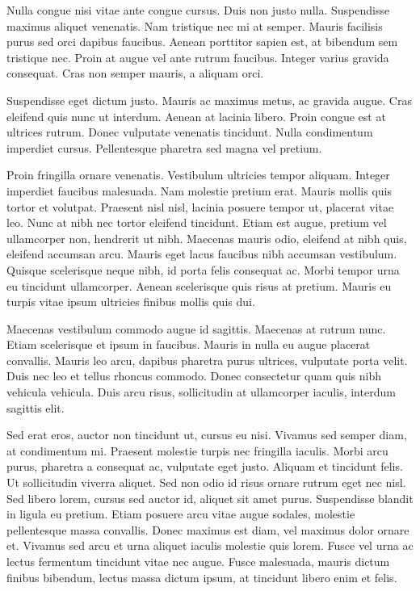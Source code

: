 Nulla congue nisi vitae ante congue cursus. Duis non justo nulla. Suspendisse maximus aliquet venenatis. Nam tristique nec mi at semper. Mauris facilisis purus sed orci dapibus faucibus. Aenean porttitor sapien est, at bibendum sem tristique nec. Proin at augue vel ante rutrum faucibus. Integer varius gravida consequat. Cras non semper mauris, a aliquam orci.

Suspendisse eget dictum justo. Mauris ac maximus metus, ac gravida augue. Cras eleifend quis nunc ut interdum. Aenean at lacinia libero. Proin congue est at ultrices rutrum. Donec vulputate venenatis tincidunt. Nulla condimentum imperdiet cursus. Pellentesque pharetra sed magna vel pretium.

Proin fringilla ornare venenatis. Vestibulum ultricies tempor aliquam. Integer imperdiet faucibus malesuada. Nam molestie pretium erat. Mauris mollis quis tortor et volutpat. Praesent nisl nisl, lacinia posuere tempor ut, placerat vitae leo. Nunc at nibh nec tortor eleifend tincidunt. Etiam est augue, pretium vel ullamcorper non, hendrerit ut nibh. Maecenas mauris odio, eleifend at nibh quis, eleifend accumsan arcu. Mauris eget lacus faucibus nibh accumsan vestibulum. Quisque scelerisque neque nibh, id porta felis consequat ac. Morbi tempor urna eu tincidunt ullamcorper. Aenean scelerisque quis risus at pretium. Mauris eu turpis vitae ipsum ultricies finibus mollis quis dui.

Maecenas vestibulum commodo augue id sagittis. Maecenas at rutrum nunc. Etiam scelerisque et ipsum in faucibus. Mauris in nulla eu augue placerat convallis. Mauris leo arcu, dapibus pharetra purus ultrices, vulputate porta velit. Duis nec leo et tellus rhoncus commodo. Donec consectetur quam quis nibh vehicula vehicula. Duis arcu risus, sollicitudin at ullamcorper iaculis, interdum sagittis elit.

Sed erat eros, auctor non tincidunt ut, cursus eu nisi. Vivamus sed semper diam, at condimentum mi. Praesent molestie turpis nec fringilla iaculis. Morbi arcu purus, pharetra a consequat ac, vulputate eget justo. Aliquam et tincidunt felis. Ut sollicitudin viverra aliquet. Sed non odio id risus ornare rutrum eget nec nisl. Sed libero lorem, cursus sed auctor id, aliquet sit amet purus. Suspendisse blandit in ligula eu pretium. Etiam posuere arcu vitae augue sodales, molestie pellentesque massa convallis. Donec maximus est diam, vel maximus dolor ornare et. Vivamus sed arcu et urna aliquet iaculis molestie quis lorem. Fusce vel urna ac lectus fermentum tincidunt vitae nec augue. Fusce malesuada, mauris dictum finibus bibendum, lectus massa dictum ipsum, at tincidunt libero enim et felis.

